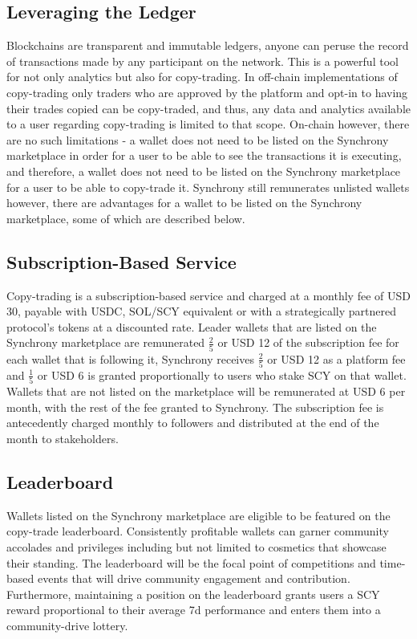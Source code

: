 \documentclass[10pt]{article}
\begin{document}
					\subsection{Leveraging the Ledger}
					Blockchains are transparent and immutable ledgers, anyone can peruse the record
					of transactions made by any participant on the network. This is a powerful tool
					for not only analytics but also for copy-trading. In off-chain implementations
					of copy-trading only traders who are approved by the platform and opt-in to
					having their trades copied can be copy-traded, and thus, any data and analytics
					available to a user regarding copy-trading is limited to that scope. On-chain
					however, there are no such limitations - a wallet does not need to be listed on
					the Synchrony marketplace in order for a user to be able to see the
					transactions it is executing, and therefore, a wallet does not need to be listed
					on the Synchrony marketplace for a user to be able to copy-trade it. Synchrony
					still remunerates unlisted wallets however, there are advantages for a wallet to
					be listed on the Synchrony marketplace, some of which are described below.

					\subsection{Subscription-Based Service}
					Copy-trading is a subscription-based service and charged at a monthly fee of USD
					30, payable with USDC, SOL/SCY equivalent or with a strategically partnered
					protocol's tokens at a discounted rate. Leader wallets that are listed on the
					Synchrony marketplace are remunerated \(\frac{2}{5}\) or USD 12 of the
					subscription fee
					for each wallet that is following it, Synchrony receives \(\frac{2}{5}\) or USD 12 as
					a platform fee and \(\frac{1}{5}\) or USD 6 is granted proportionally to users who stake SCY
					on that wallet. Wallets that are not listed on the marketplace will be
					remunerated at USD 6 per month, with the rest of the fee granted to Synchrony.
					The subscription fee is antecedently charged monthly to followers and
					distributed at the end of the month to stakeholders.

					\subsection{Leaderboard}
					Wallets listed on the Synchrony marketplace are eligible to be featured on the
					copy-trade leaderboard. Consistently profitable wallets can garner community
					accolades and privileges including but not limited to cosmetics that showcase
					their standing. The leaderboard will be the focal point of competitions and
					time-based events that will drive community engagement and contribution.
					Furthermore, maintaining a position on the leaderboard grants users a SCY reward
					proportional to their average 7d performance and enters them into
					a community-drive lottery.
\end{document}
